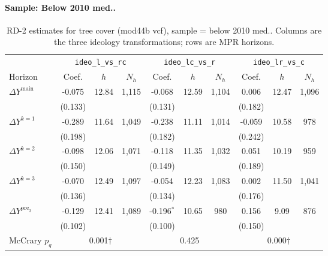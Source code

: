 \documentclass[11pt]{article}
\begin{document}
\paragraph{Sample: Below 2010 med..}
\begin{table}[H]
\centering
\scriptsize
\caption{RD-2 estimates for tree cover (mod44b vcf), sample = below 2010 med..
Columns are the three ideology transformations; rows are MPR horizons.}
\label{tab:rd2_tree_cover_below}
\begin{tabular}{l ccc ccc ccc}
\toprule
 & \multicolumn{3}{c}{\texttt{ideo\_l\_vs\_rc}}
 & \multicolumn{3}{c}{\texttt{ideo\_lc\_vs\_r}}
 & \multicolumn{3}{c}{\texttt{ideo\_lr\_vs\_c}} \\
\cmidrule(lr){2-4} \cmidrule(lr){5-7} \cmidrule(lr){8-10}
Horizon & Coef. & $h$ & $N_h$ & Coef. & $h$ & $N_h$ & Coef. & $h$ & $N_h$ \\
\midrule
$\Delta Y^{\text{main}}$ & -0.075 & 12.84 & 1,115 & -0.068 & 12.59 & 1,104 & 0.006 & 12.47 & 1,096 \\
 & (0.133) &  &  & (0.131) &  &  & (0.182) &  &  \\
\addlinespace[1pt]
$\Delta Y^{k=1}$ & -0.289 & 11.64 & 1,049 & -0.238 & 11.11 & 1,014 & -0.059 & 10.58 & 978 \\
 & (0.198) &  &  & (0.182) &  &  & (0.242) &  &  \\
\addlinespace[1pt]
$\Delta Y^{k=2}$ & -0.098 & 12.06 & 1,071 & -0.118 & 11.35 & 1,032 & 0.051 & 10.19 & 959 \\
 & (0.150) &  &  & (0.149) &  &  & (0.189) &  &  \\
\addlinespace[1pt]
$\Delta Y^{k=3}$ & -0.070 & 12.49 & 1,097 & -0.054 & 12.23 & 1,083 & 0.002 & 11.50 & 1,041 \\
 & (0.136) &  &  & (0.134) &  &  & (0.176) &  &  \\
\addlinespace[1pt]
$\Delta Y^{\text{pre}_3}$ & -0.129 & 12.41 & 1,089 & -0.196$^{*}$ & 10.65 & 980 & 0.156 & 9.09 & 876 \\
 & (0.102) &  &  & (0.100) &  &  & (0.150) &  &  \\
\addlinespace[1pt]
\midrule
McCrary $p_q$ & \multicolumn{3}{c}{0.001$\dagger$} & \multicolumn{3}{c}{0.425} & \multicolumn{3}{c}{0.000$\dagger$} \\
\bottomrule
\end{tabular}
\end{table}
\end{document}
